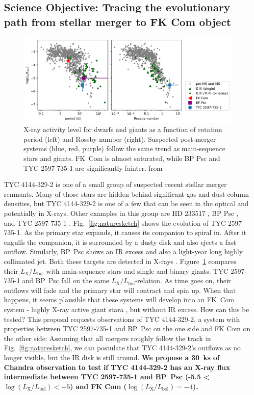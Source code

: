 \documentclass[letterpaper,11pt]{article}
\begin{document}
\subsection*{Science Objective: Tracing the evolutionary path from stellar merger to FK Com object}


\begin{figure}
    \includegraphics[width=.7\textwidth]{lxlbol}
    \caption{X-ray activity level for dwarfs and giants as a function of rotation period (left) and Rossby number (right). Suspected post-merger systems (blue, red, purple) follow the same trend as main-sequence stars and giants.  FK~Com is almost saturated, while BP Psc and TYC 2597-735-1 are significantly fainter. from \cite{2022arXiv220205424G}
    \label{fig:lxlbol}}
\end{figure}

 TYC 4144-329-2 is one of a small group of suspected recent stellar merger remnants. Many of those stars are hidden behind significant gas and dust column densities, but 
 TYC 4144-329-2 is one of a few that can be seen in the optical \cite{2020RNAAS...4..238M} and potentially in X-rays. Other examples in this group are HD 233517 \cite{2003ApJ...582.1032J}, BP Psc \cite{Zuckerman_2008}, and  TYC 2597-735-1 \cite{2020Natur.587..387H}. Fig.~\ref{fig:naturesketch} shows the evolution of TYC 2597-735-1. As the primary star expands, it causes its companion to spiral in. After it engulfs the companion, it is surrounded by a dusty disk and also ejects a fast outflow. Similarly, BP~Psc shows an IR excess and also a light-year long highly collimated jet. Both these targets are detected in X-rays \cite{2010ApJ...719L..65K,2022arXiv220205424G}. Figure~\ref{fig:lxlbol} compares their $L_\mathrm{X}/L_\mathrm{bol}$ with main-sequence stars and single and binary giants. TYC 2597-735-1 and BP~Psc fall on the same $L_\mathrm{X}/L_\mathrm{bol}$-relation. As time goes on, their outflows will fade and the primary star will contract and spin up. When that happens, it seems plausible that these systems will develop into an FK~Com system - highly X-ray active giant stara \cite{2016ApJS..223....5A}, but without IR excess. How can this be tested? This proposal requests observations of TYC 4144-329-2, a system with properties between 
TYC 2597-735-1 and BP~Psc on the one side and FK Com on the other side: Assuming that all mergers roughly follow the track in Fig.~\ref{fig:naturesketch}, we can postulate that TYC 4144-329-2's outflows as no longer visible, but the IR disk is still around. \textbf{We propose a 30~ks of Chandra observation to test if TYC 4144-329-2 has an X-ray flux intermediate between TYC 2597-735-1 and BP~Psc  (-5.5 < $\log(L_\mathrm{X}/L_\mathrm{bol}) <-5$) and FK Com ($\log(L_\mathrm{X}/L_\mathrm{bol}) =-4$).}
\end{document}
